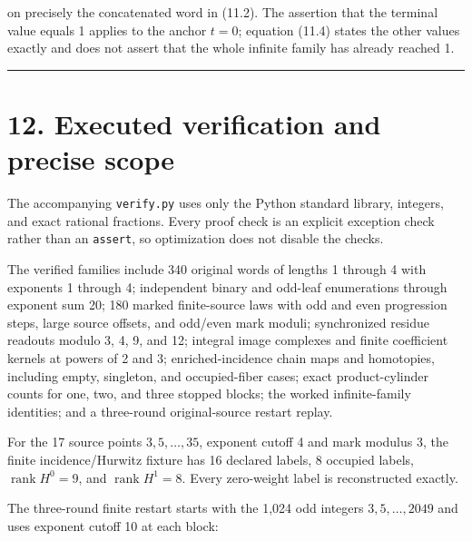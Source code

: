 on precisely the concatenated word in (11.2). The assertion that the
terminal value equals 1 applies to the anchor \(t=0\); equation (11.4)
states the other values exactly and does not assert that the whole
infinite family has already reached 1.

\begin{center}\rule{0.5\linewidth}{0.5pt}\end{center}

\section{12. Executed verification and precise scope}

The accompanying \nolinkurl{verify.py} uses only the Python standard
library, integers, and exact rational fractions. Every proof check is an
explicit exception check rather than an \nolinkurl{assert}, so
optimization does not disable the checks.

The verified families include 340 original words of lengths 1 through 4
with exponents 1 through 4; independent binary and odd-leaf enumerations
through exponent sum 20; 180 marked finite-source laws with odd and even
progression steps, large source offsets, and odd/even mark moduli;
synchronized residue readouts modulo 3, 4, 9, and 12; integral image
complexes and finite coefficient kernels at powers of 2 and 3;
enriched-incidence chain maps and homotopies, including empty,
singleton, and occupied-fiber cases; exact product-cylinder counts for
one, two, and three stopped blocks; the worked infinite-family
identities; and a three-round original-source restart replay.

For the 17 source points \(3,5,\ldots,35\), exponent cutoff 4 and mark
modulus 3, the finite incidence/Hurwitz fixture has 16 declared labels,
8 occupied labels, \(\operatorname{rank}H^0=9\), and
\(\operatorname{rank}H^1=8\). Every zero-weight label is reconstructed
exactly.

The three-round finite restart starts with the 1,024 odd integers
\(3,5,\ldots,2049\) and uses exponent cutoff 10 at each block:

